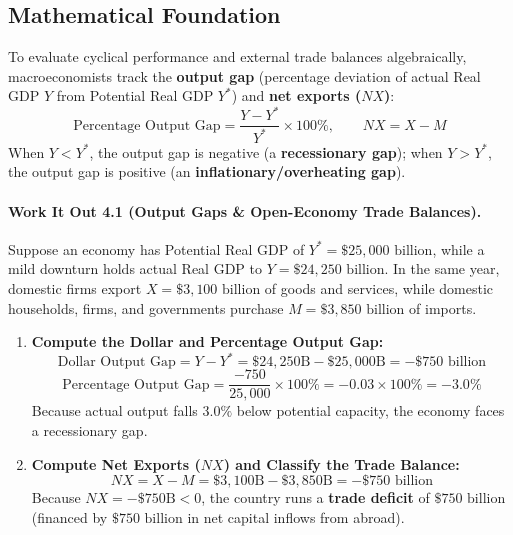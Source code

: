 \documentclass[11pt,letterpaper]{article}
\begin{document}
\subsection*{Mathematical Foundation}
To evaluate cyclical performance and external trade balances algebraically, macroeconomists track the \textbf{output gap} (percentage deviation of actual Real GDP $Y$ from Potential Real GDP $Y^*$) and \textbf{net exports ($NX$)}:
\begin{equation}
\text{Percentage Output Gap} = \frac{Y - Y^*}{Y^*} \times 100\%, \qquad NX = X - M
\end{equation}
When $Y < Y^*$, the output gap is negative (a \textbf{recessionary gap}); when $Y > Y^*$, the output gap is positive (an \textbf{inflationary/overheating gap}).

\paragraph{Work It Out 4.1 (Output Gaps \& Open-Economy Trade Balances).}
Suppose an economy has Potential Real GDP of $Y^* = \$25{,}000\text{ billion}$, while a mild downturn holds actual Real GDP to $Y = \$24{,}250\text{ billion}$. In the same year, domestic firms export $X = \$3{,}100\text{ billion}$ of goods and services, while domestic households, firms, and governments purchase $M = \$3{,}850\text{ billion}$ of imports.
\begin{enumerate}
    \item \textbf{Compute the Dollar and Percentage Output Gap:}
    $$\text{Dollar Output Gap} = Y - Y^* = \$24{,}250\text{B} - \$25{,}000\text{B} = -\$750\text{ billion}$$
    $$\text{Percentage Output Gap} = \frac{-750}{25{,}000} \times 100\% = -0.03 \times 100\% = -3.0\%$$
    Because actual output falls $3.0\%$ below potential capacity, the economy faces a recessionary gap.
    \item \textbf{Compute Net Exports ($NX$) and Classify the Trade Balance:}
    $$NX = X - M = \$3{,}100\text{B} - \$3{,}850\text{B} = -\$750\text{ billion}$$
    Because $NX = -\$750\text{B} < 0$, the country runs a \textbf{trade deficit} of $\$750\text{ billion}$ (financed by $\$750\text{ billion}$ in net capital inflows from abroad).
\end{enumerate}
\end{document}
